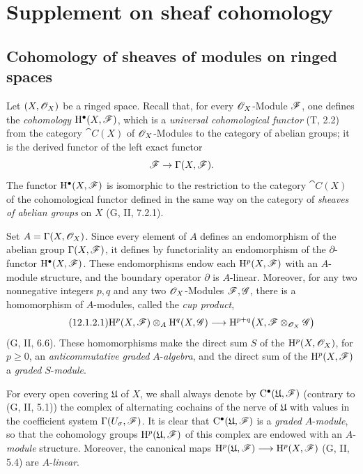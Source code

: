 \section{Supplement on sheaf cohomology}
\label{section:0.12}

\subsection{Cohomology of sheaves of modules on ringed spaces}
\label{subsection:0.12.1}

\begin{env}[12.1.1]
\label{0.12.1.1}
Let $(X,\mathscr{O}_X)$ be a ringed space.
Recall that, for every $\mathscr{O}_X$-Module $\mathscr{F}$, one defines the
\emph{cohomology} $\mathrm{H}^\bullet(X,\mathscr{F})$, which is a \emph{universal cohomological
functor} (T, 2.2) from the category $\cat{C}(X)$ of
$\mathscr{O}_X$-Modules to the category of abelian groups; it is the derived
functor of the left exact functor
\[
  \mathscr{F}\to\Gamma(X,\mathscr{F}).
\]
The functor $\mathrm{H}^\bullet(X,\mathscr{F})$ is isomorphic
to the restriction to the category $\cat{C}(X)$ of the cohomological
functor defined in the same way on the category of \emph{sheaves of abelian
groups} on $X$ (G, II, 7.2.1).
\end{env}

\begin{env}[12.1.2]
\label{0.12.1.2}
Set $A=\Gamma(X,\mathscr{O}_X)$.
Since every element of $A$ defines an endomorphism of the abelian group
$\Gamma(X,\mathscr{F})$, it defines by functoriality an endomorphism of the
$\partial$-functor $\mathrm{H}^\bullet(X,\mathscr{F})$.
These endomorphisms endow each $\mathrm{H}^p(X,\mathscr{F})$ with an
$A$-module structure, and the boundary operator $\partial$ is
$A$-linear.
Moreover, for any two nonnegative integers $p,q$ and any two
$\mathscr{O}_X$-Modules $\mathscr{F},\mathscr{G}$, there is a homomorphism of
$A$-modules, called the \emph{cup product},
\[
\label{0.12.1.2.1}
\tag{12.1.2.1}
  \mathrm{H}^p(X,\mathscr{F})\otimes_A\mathrm{H}^q(X,\mathscr{G})
  \longrightarrow
  \mathrm{H}^{p+q}\bigl(X,\mathscr{F}\otimes_{\mathscr{O}_X}\mathscr{G}\bigr)
\]
(G, II, 6.6).
These homomorphisms make the direct sum $S$ of the
$\mathrm{H}^p(X,\mathscr{O}_X)$, for $p\geq0$, an \emph{anticommutative graded}
$A$-\emph{algebra}, and the direct sum of the $\mathrm{H}^p(X,\mathscr{F})$ a \emph{graded}
$S$-\emph{module}.

For every open covering $\mathfrak{U}$ of $X$, we shall always denote
by $\mathrm{C}^\bullet(\mathfrak{U},\mathscr{F})$ (contrary to
(G, II, 5.1)) the complex of alternating cochains of the nerve of
$\mathfrak{U}$ with values in the coefficient system
$\Gamma(U_\sigma,\mathscr{F})$.
It is clear that
$\mathrm{C}^\bullet(\mathfrak{U},\mathscr{F})$ is a \emph{graded}
$A$-\emph{module}, so that the cohomology groups
$\mathrm{H}^p(\mathfrak{U},\mathscr{F})$ of this complex are endowed with
an $A$-\emph{module} structure.
Moreover, the canonical maps $\mathrm{H}^p(\mathfrak{U},\mathscr{F})
\longrightarrow
\mathrm{H}^p(X,\mathscr{F})$
(G, II, 5.4) are $A$-\emph{linear}.
\end{env}

